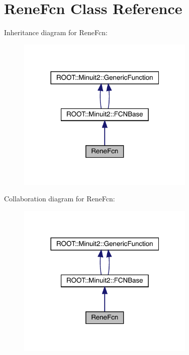 \hypertarget{classReneFcn}{}\section{Rene\+Fcn Class Reference}
\label{classReneFcn}


Inheritance diagram for Rene\+Fcn\+:\nopagebreak
\begin{figure}[H]
\begin{center}
\leavevmode
\includegraphics[width=240pt]{db/db4/classReneFcn__inherit__graph}
\end{center}
\end{figure}


Collaboration diagram for Rene\+Fcn\+:\nopagebreak
\begin{figure}[H]
\begin{center}
\leavevmode
\includegraphics[width=240pt]{d5/d76/classReneFcn__coll__graph}
\end{center}
\end{figure}
